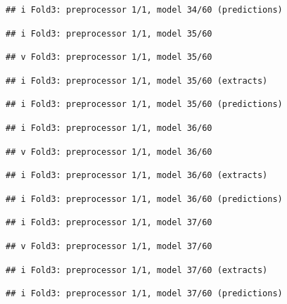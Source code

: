 \documentclass[
]{article}
\begin{document}
\begin{verbatim}
## i Fold3: preprocessor 1/1, model 34/60 (predictions)
\end{verbatim}

\begin{verbatim}
## i Fold3: preprocessor 1/1, model 35/60
\end{verbatim}

\begin{verbatim}
## v Fold3: preprocessor 1/1, model 35/60
\end{verbatim}

\begin{verbatim}
## i Fold3: preprocessor 1/1, model 35/60 (extracts)
\end{verbatim}

\begin{verbatim}
## i Fold3: preprocessor 1/1, model 35/60 (predictions)
\end{verbatim}

\begin{verbatim}
## i Fold3: preprocessor 1/1, model 36/60
\end{verbatim}

\begin{verbatim}
## v Fold3: preprocessor 1/1, model 36/60
\end{verbatim}

\begin{verbatim}
## i Fold3: preprocessor 1/1, model 36/60 (extracts)
\end{verbatim}

\begin{verbatim}
## i Fold3: preprocessor 1/1, model 36/60 (predictions)
\end{verbatim}

\begin{verbatim}
## i Fold3: preprocessor 1/1, model 37/60
\end{verbatim}

\begin{verbatim}
## v Fold3: preprocessor 1/1, model 37/60
\end{verbatim}

\begin{verbatim}
## i Fold3: preprocessor 1/1, model 37/60 (extracts)
\end{verbatim}

\begin{verbatim}
## i Fold3: preprocessor 1/1, model 37/60 (predictions)
\end{verbatim}
\end{document}
